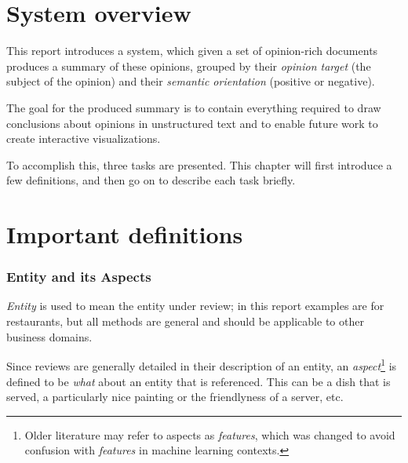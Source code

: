 \documentclass[a4paper,11pt]{kth-mag}
\newcommand{\gls}[1]{TODO(#1)}
\begin{document}
%
%



\section{System overview}
This report introduces a system, which given a set of opinion-rich documents produces a summary of these
opinions, grouped by their \emph{opinion target} (the subject of the opinion)
and their \emph{semantic orientation} (positive or negative).

The goal for the produced summary is to contain everything required to draw conclusions about opinions in
unstructured text and to enable future work to create interactive visualizations.

To accomplish this, three tasks are presented. This chapter will first introduce a few definitions,
and then go on to describe each task briefly.


\clearpage
\section{Important definitions}

\subsubsection{Entity and its Aspects}
\emph{Entity} is used to mean the entity under review; in this report examples are for restaurants, but all methods
are general and should be applicable to other business domains.

Since reviews are generally detailed in their description of an entity,
an \emph{aspect}\footnote{
  Older literature may refer to aspects as \emph{features}, which was changed to
  avoid confusion with \emph{features} in machine learning contexts.}
is defined to be \emph{what} about an entity that is referenced. This can be a dish that is served, a particularly nice painting or the friendlyness of a server, etc.
\end{document}
